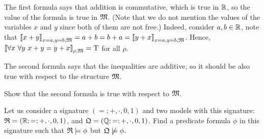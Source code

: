 The first formula says that addition is commutative, which is true in ${\mathbb{R}}$, so
the value of the formula is true in $\mathfrak{M}$. 
(Note that we do not mention the values of the variables $x$ and $y$
since both of them are not free.) Indeed, consider $a, b \in {\mathbb{R}}$, note that
$\left\llbracket {x + y} \right\rrbracket_{x = a, y = b, \mathfrak{M}} = a + b = b + a = 
  \left\llbracket {y + x} \right\rrbracket_{x = a, y = b, \mathfrak{M}}$. Hence, 
$\left\llbracket {\forall x \ \forall y \ x + y = y + x} \right\rrbracket_{\rho, \mathfrak{M}} = \text{T}$
for all $\rho$.

The second formula says that the inequalities are additive, so it should be also
true with respect to the structure $\mathfrak{M}$.
\begin{exercise}
  Show that the second formula is true with respect to $\mathfrak{M}$.
\end{exercise}

\begin{exercise}
  Let us consider a signature $(=; +, \cdot, 0, 1)$ and two models with this
  signature: $\mathfrak{R} = ({\mathbb{R}}; =; +, \cdot, 0, 1)$, and
  $\mathfrak{Q} = ({\mathbb{Q}}; =; +, \cdot, 0, 1)$.
  Find a predicate formula $\phi$ in this signature such that
  $\mathfrak{R} \models \phi$ but $\mathfrak{Q} \not\models \phi$.
\end{exercise}

